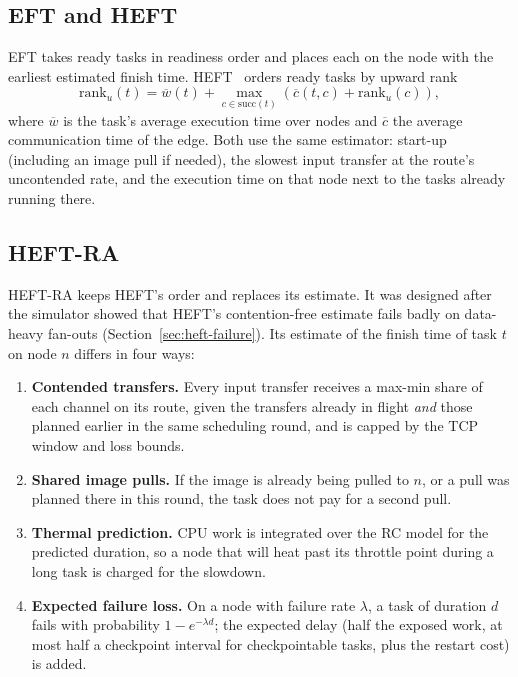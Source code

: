 \documentclass[12pt,a4paper]{report}
\begin{document}
\subsection{EFT and HEFT}

EFT takes ready tasks in readiness order and places each on the node with
the earliest estimated finish time. HEFT~\cite{topcuoglu2002heft} orders
ready tasks by upward rank
\begin{equation}
\mathrm{rank}_u(t) = \overline{w}(t) + \max_{c \in \mathrm{succ}(t)}
\left(\overline{c}(t, c) + \mathrm{rank}_u(c)\right),
\end{equation}
where $\overline{w}$ is the task's average execution time over nodes and
$\overline{c}$ the average communication time of the edge. Both use the
same estimator: start-up (including an image pull if needed), the slowest
input transfer at the route's uncontended rate, and the execution time on
that node next to the tasks already running there.

\subsection{HEFT-RA}
\label{sec:heftra}

HEFT-RA keeps HEFT's order and replaces its estimate. It was designed after
the simulator showed that HEFT's contention-free estimate fails badly on
data-heavy fan-outs (Section~\ref{sec:heft-failure}). Its estimate of the
finish time of task $t$ on node $n$ differs in four ways:

\begin{enumerate}
\item \textbf{Contended transfers.} Every input transfer receives a max-min
      share of each channel on its route, given the transfers already in
      flight \emph{and} those planned earlier in the same scheduling round,
      and is capped by the TCP window and loss bounds.
\item \textbf{Shared image pulls.} If the image is already being pulled to
      $n$, or a pull was planned there in this round, the task does not pay
      for a second pull.
\item \textbf{Thermal prediction.} CPU work is integrated over the RC model
      for the predicted duration, so a node that will heat past its
      throttle point during a long task is charged for the slowdown.
\item \textbf{Expected failure loss.} On a node with failure rate
      $\lambda$, a task of duration $d$ fails with probability
      $1-e^{-\lambda d}$; the expected delay (half the exposed work, at
      most half a checkpoint interval for checkpointable tasks, plus the
      restart cost) is added.
\end{enumerate}
\end{document}

